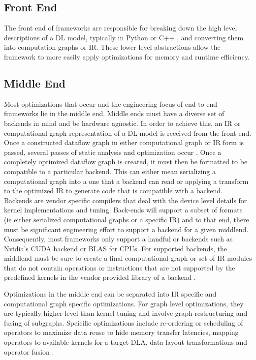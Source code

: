 
\subsection{Front End}
The front end of frameworks are responsible for breaking down the high level
descriptions of a DL model, typically in Python or C++ \cite{tensorflow}, and
converting them into computation graphs or IR. These lower level abstractions
allow the framework to more easily apply optimizations for memory and runtime
efficiency.

\subsection{Middle End}
Most optimizations that occur and the engineering focus of end to end
frameworks lie in the middle end. Middle ends must have a diverse set of
backends in mind and be hardware agnostic. In order to achieve this, an IR or
computational graph representation of a DL model is received from the front
end. Once a constructed dataflow graph in either computational graph or IR
form is passed, several passes of static analysis and optimization occur
\cite{TVM} \cite{DLVM} \cite{tensorflow}. Once a completely optimized dataflow
graph is created, it must then be formatted to be compatible to a particular
backend. This can either mean serializing a computational graph into a one
that a backend can read or applying a transform to the optimized IR to generate
code that is compatible with a backend. Backends are vendor specific compilers
that deal with the device level details for kernel implementations and tuning.
Back-ends will support a subset of formats (ie either serialized computational
graphs or a specific IR) and to that end, there must be significant engineering
effort to support a backend for a given middlend. Consequently, most frameworks
only support a handful or backends such as Nvidia's CUDA backend or BLAS for
CPUs. For supported backends, the middlend must be sure to create a final
computational graph or set of IR modules that do not contain operations or
instructions that are not supported by the predefined kernels in the vendor
provided library of a backend \cite{TVM}.

Optimizations in the middle end can be separated into IR specific and
computational graph specific optimizations. For graph level optimizations,
they are typically higher level than kernel tuning and involve graph
restructuring and fusing of subgraphs. Speicific optimizations include
re-ordering or scheduling of operators to maximize data reuse
to hide memory transfer latencies, mapping operators to available kernels
for a target DLA, data layout transformations and operator fusion \cite{TVM}.

